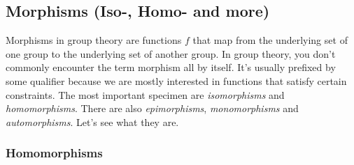 \subsection{Morphisms (Iso-, Homo- and more)}


Morphisms in group theory are functions $f$ that map from the underlying set of one group to the underlying set of another group. In group theory, you don't commonly encounter the term morphism all by itself. It's usually prefixed by some qualifier because we are mostly interested in functions that satisfy certain constraints. The most important specimen are \emph{isomorphisms} and \emph{homomorphisms}. There are also \emph{epimorphisms}, \emph{monomorphisms} and \emph{automorphisms}. Let's see what they are.

\subsubsection{Homomorphisms}

